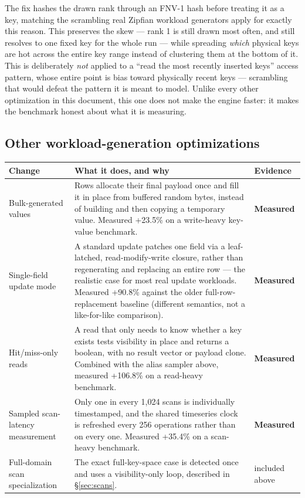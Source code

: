 \documentclass[11pt]{article}
\newcommand{\gainmeasured}{\textbf{Measured}}
\begin{document}
The fix hashes the drawn rank through an FNV-1 hash before treating it as a key,
matching the scrambling real Zipfian workload generators apply for exactly this
reason. This preserves the skew --- rank 1 is still drawn most often, and still
resolves to one fixed key for the whole run --- while spreading \emph{which}
physical keys are hot across the entire key range instead of clustering them at the
bottom of it. This is deliberately \emph{not} applied to a ``read the most recently
inserted keys'' access pattern, whose entire point is bias toward physically recent
keys --- scrambling that would defeat the pattern it is meant to model. Unlike every
other optimization in this document, this one does not make the engine faster: it
makes the benchmark honest about what it is measuring.

\subsection{Other workload-generation optimizations}

\begin{center}
\begin{tabular}{p{4.3cm}p{7.4cm}p{2.4cm}}
\toprule
\textbf{Change} & \textbf{What it does, and why} & \textbf{Evidence} \\
\midrule
Bulk-generated values & Rows allocate their final payload once and fill it in place
  from buffered random bytes, instead of building and then copying a temporary
  value. Measured +23.5\% on a write-heavy key-value benchmark. & \gainmeasured \\
Single-field update mode & A standard update patches one field via a leaf-latched,
  read-modify-write closure, rather than regenerating and replacing an entire row ---
  the realistic case for most real update workloads. Measured +90.8\% against the
  older full-row-replacement baseline (different semantics, not a like-for-like
  comparison). & \gainmeasured \\
Hit/miss-only reads & A read that only needs to know whether a key exists tests
  visibility in place and returns a boolean, with no result vector or payload clone.
  Combined with the alias sampler above, measured +106.8\% on a read-heavy
  benchmark. & \gainmeasured \\
Sampled scan-latency measurement & Only one in every 1,024 scans is individually
  timestamped, and the shared timeseries clock is refreshed every 256 operations
  rather than on every one. Measured +35.4\% on a scan-heavy benchmark. &
  \gainmeasured \\
Full-domain scan specialization & The exact full-key-space case is detected once
  and uses a visibility-only loop, described in \S\ref{sec:scans}. & included above \\
\bottomrule
\end{tabular}
\end{center}
\end{document}

